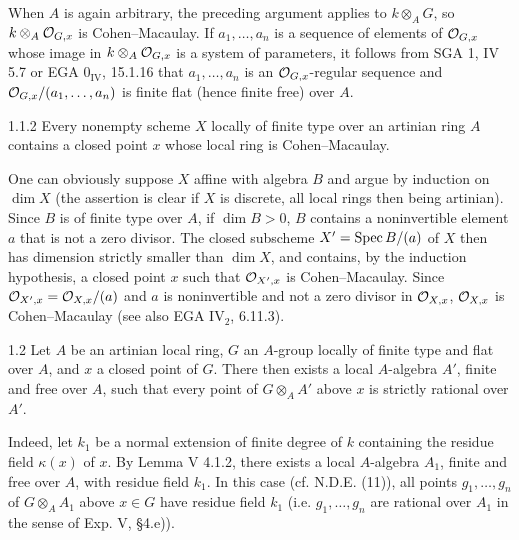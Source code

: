 When $A$ is again arbitrary, the preceding argument applies to $k\otimes_AG$, so $k\otimes_A\mathcal{O}_{G,x}$ is Cohen--Macaulay. If $a_1,\ldots,a_n$ is a sequence of elements of $\mathcal{O}_{G,x}$ whose image in $k\otimes_A\mathcal{O}_{G,x}$ is a system of parameters, it follows from SGA 1, IV 5.7 or EGA $0_{\mathrm{IV}}$, 15.1.16 that $a_1,\ldots,a_n$ is an $\mathcal{O}_{G,x}$-regular sequence and $\mathcal{O}_{G,x}/(a_1,\ldots,a_n)$ is finite flat (hence finite free) over $A$.
\begin{lemma}{1.1.2}\label{VIA.1.1.2}
Every nonempty scheme $X$ locally of finite type over an artinian ring $A$ contains a closed point $x$ whose local ring is Cohen--Macaulay.
\end{lemma}
One can obviously suppose $X$ affine with algebra $B$ and argue by induction on $\dim X$ (the assertion is clear if $X$ is discrete, all local rings then being artinian). Since $B$ is of finite type over $A$, if $\dim B>0$, $B$ contains a noninvertible element $a$ that is not a zero divisor. The closed subscheme $X'=\operatorname{Spec} B/(a)$ of $X$ then has dimension strictly smaller than $\dim X$, and contains, by the induction hypothesis, a closed point $x$ such that $\mathcal{O}_{X',x}$ is Cohen--Macaulay. Since $\mathcal{O}_{X',x}=\mathcal{O}_{X,x}/(a)$ and $a$ is noninvertible and not a zero divisor in $\mathcal{O}_{X,x}$, $\mathcal{O}_{X,x}$ is Cohen--Macaulay (see also EGA IV$_2$, 6.11.3).
\begin{proposition}{1.2}\label{VIA.1.2}
Let $A$ be an artinian local ring, $G$ an $A$-group locally of finite type and flat over $A$, and $x$ a closed point of $G$. There then exists a local $A$-algebra $A'$, finite and free over $A$, such that every point of $G\otimes_AA'$ above $x$ is strictly rational over $A'$.
\end{proposition}
Indeed, let $k_1$ be a normal extension of finite degree of $k$ containing the residue field $\kappa(x)$ of $x$. By Lemma V 4.1.2, there exists a local $A$-algebra $A_1$, finite and free over $A$, with residue field $k_1$. In this case (cf. N.D.E. (11)), all points $g_1,\ldots,g_n$ of $G\otimes_AA_1$ above $x\in G$ have residue field $k_1$ (i.e. $g_1,\ldots,g_n$ are rational over $A_1$ in the sense of Exp. V, §4.e)).

